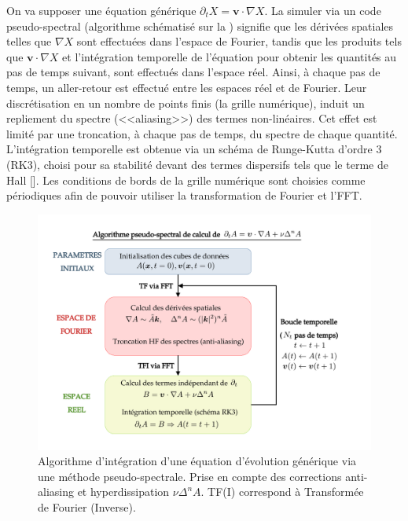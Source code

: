  On va supposer une équation générique $\partial_t X = \boldsymbol{v} \cdot \nabla  X$. La simuler via un code pseudo-spectral (algorithme schématisé sur la ) signifie que les dérivées spatiales telles que $\nabla X$ sont effectuées dans l'espace de Fourier, tandis que les produits tels que $\boldsymbol{v} \cdot \nabla  X$  et l'intégration temporelle de l'équation pour obtenir les quantités au pas de temps suivant, sont effectués dans l'espace réel. Ainsi, à chaque pas de temps, un aller-retour est effectué entre les espaces réel et de Fourier. Leur discrétisation en un nombre de points finis (la grille numérique), induit un repliement du spectre (<<aliasing>>) des termes non-linéaires. Cet effet est limité par une troncation, à chaque pas de temps, du spectre de chaque quantité. L'intégration temporelle est obtenue via un schéma de Runge-Kutta d'ordre 3 (RK3), choisi pour sa stabilité devant des termes dispersifs tels que le terme de Hall [\cite{williamson_low-storage_1980}]. Les conditions de bords de la grille numérique sont choisies comme périodiques afin de pouvoir utiliser la transformation de Fourier et l'\ac{FFT}. 
 \begin{figure}[!ht]
 \centering
\includegraphics[width=0.9\linewidth,trim=1cm 1cm 3cm 1cm, clip=true]{./Part_3/images_ch1/code_OCA}
\cprotect\caption{Algorithme d'intégration d'une équation d'évolution générique via une méthode pseudo-spectrale. Prise en compte des corrections anti-aliasing et hyperdissipation $\nu \Delta^n A$. TF(I) correspond à Transformée de Fourier (Inverse). }
\label{fig:algo_OCA}
\end{figure}

